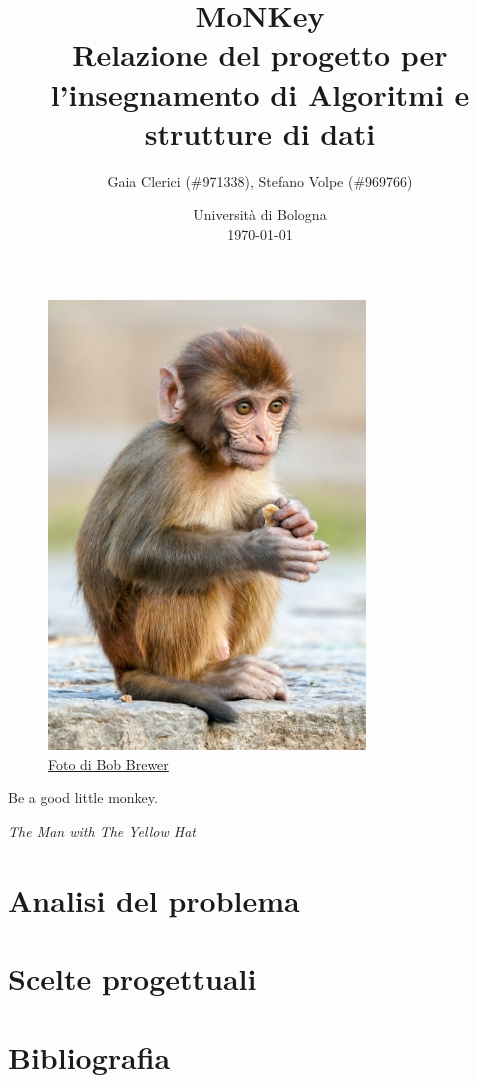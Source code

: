 \documentclass[a4paper]{article}
\title{MoNKey \\
\small Relazione del progetto per l'insegnamento di Algoritmi e strutture di
dati}
\author{
  Gaia Clerici (\#971338),
  Stefano Volpe (\#969766)
}
\date{
	Universit\`a di Bologna \\
  \today
}
\begin{document}
\maketitle

\begin{figure}[h]
  \includegraphics[width=0.75\textwidth]{monkey}
  \centering
  \caption{\href{https://unsplash.com/photos/daC7ji1EMHM}{Foto di Bob Brewer}}
\end{figure}

\pagebreak

\epigraph{Be a good little monkey.}{\textit{The Man with The Yellow Hat}}

\section{Analisi del problema}

\section{Scelte progettuali}

\section{Bibliografia}
\end{document}
